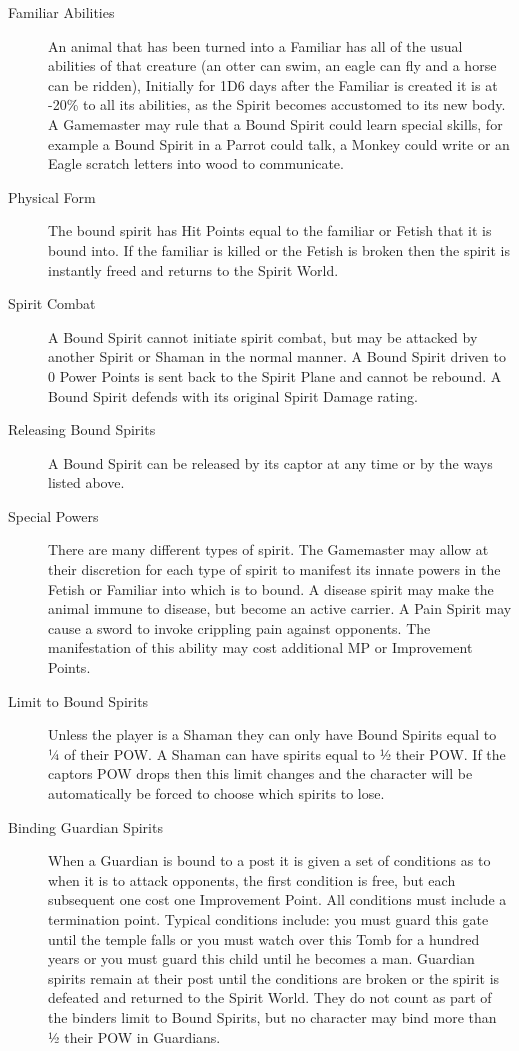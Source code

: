 \begin{rpg-spell}
\begin{description}
\item[Familiar Abilities] An animal that has been turned into a Familiar has all of the usual abilities of that creature (an otter can swim, an eagle can fly and a horse can be ridden), Initially for 1D6 days after the Familiar is created it is at -20\% to all its abilities, as the Spirit becomes accustomed to its new body. A Gamemaster may rule that a Bound Spirit could learn special skills, for example a Bound Spirit in a Parrot could talk, a Monkey could write or an Eagle scratch letters into wood to communicate.  
\item[Physical Form] The bound spirit has Hit Points equal to the familiar or Fetish that it is bound into. If the familiar is killed or the Fetish is broken then the spirit is instantly freed and returns to the Spirit World.
\item[Spirit Combat] A Bound Spirit cannot initiate spirit combat, but may be attacked by another Spirit or Shaman in the normal manner. A Bound Spirit driven to 0 Power Points is sent back to the Spirit Plane and cannot be rebound. A Bound Spirit defends with its original Spirit Damage rating.
\item[Releasing Bound Spirits] A Bound Spirit can be released by its captor at any time or by the ways listed above.
\item[Special Powers] There are many different types of spirit. The Gamemaster may allow at their discretion for each type of spirit to manifest its innate powers in the Fetish or Familiar into which is to bound. A disease spirit may make the animal immune to disease, but become an active carrier. A Pain Spirit may cause a sword to invoke crippling pain against opponents. The manifestation of this ability may cost additional MP or Improvement Points.
\item[Limit to Bound Spirits] Unless the player is a Shaman they can only have Bound Spirits equal to ¼ of their POW. A Shaman can have spirits equal to ½ their POW. If the captors POW drops then this limit changes and the character will be automatically be forced to choose which spirits to lose.
\item[Binding Guardian Spirits] When a Guardian is bound to a post it is given a set of conditions as to when it is to attack opponents, the first condition is free, but each subsequent one cost one Improvement Point. All conditions must include a termination point. Typical conditions include: you must guard this gate until the temple falls or you must watch over this Tomb for a hundred years or you must guard this child until he becomes a man. Guardian spirits remain at their post until the conditions are broken or the spirit is defeated and returned to the Spirit World. They do not count as part of the binders limit to Bound Spirits, but no character may bind more than ½ their POW in Guardians. 
\end{description}
\end{rpg-spell}


